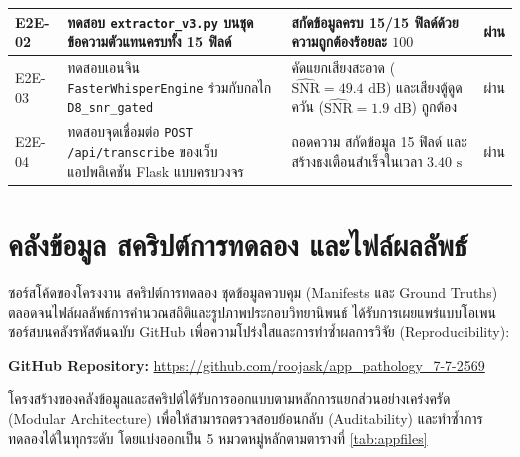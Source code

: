 \begin{table}[H]
\begin{tabular}{|p{1.7cm}|p{5.0cm}|p{5.0cm}|p{1.4cm}|}
\hline
E2E-02 & ทดสอบ \texttt{extractor\_v3.py} บนชุดข้อความตัวแทนครบทั้ง 15 ฟิลด์ & สกัดข้อมูลครบ 15/15 ฟิลด์ด้วยความถูกต้องร้อยละ $100$ & ผ่าน \\
\hline
E2E-03 & ทดสอบเอนจิน \texttt{FasterWhisperEngine} ร่วมกับกลไก \texttt{D8\_snr\_gated} & คัดแยกเสียงสะอาด ($\widehat{\mathrm{SNR}} = 49.4\text{ dB}$) และเสียงตู้ดูดควัน ($\widehat{\mathrm{SNR}} = 1.9\text{ dB}$) ถูกต้อง & ผ่าน \\
\hline
E2E-04 & ทดสอบจุดเชื่อมต่อ \texttt{POST /api/transcribe} ของเว็บแอปพลิเคชัน Flask แบบครบวงจร & ถอดความ สกัดข้อมูล 15 ฟิลด์ และสร้างธงเตือนสำเร็จในเวลา $3.40\text{ s}$ & ผ่าน \\
\hline
\end{tabular}
\end{table}

\section*{คลังข้อมูล สคริปต์การทดลอง และไฟล์ผลลัพธ์}

ซอร์สโค้ดของโครงงาน สคริปต์การทดลอง ชุดข้อมูลควบคุม (Manifests และ Ground Truths) ตลอดจนไฟล์ผลลัพธ์การคำนวณสถิติและรูปภาพประกอบวิทยานิพนธ์ ได้รับการเผยแพร่แบบโอเพนซอร์สบนคลังรหัสต้นฉบับ GitHub เพื่อความโปร่งใสและการทำซ้ำผลการวิจัย (Reproducibility):
\begin{center}
\textbf{GitHub Repository:} \url{https://github.com/roojask/app_pathology_7-7-2569}
\end{center}

โครงสร้างของคลังข้อมูลและสคริปต์ได้รับการออกแบบตามหลักการแยกส่วนอย่างเคร่งครัด (Modular Architecture) เพื่อให้สามารถตรวจสอบย้อนกลับ (Auditability) และทำซ้ำการทดลองได้ในทุกระดับ โดยแบ่งออกเป็น 5 หมวดหมู่หลักตามตารางที่ \ref{tab:appfiles}

